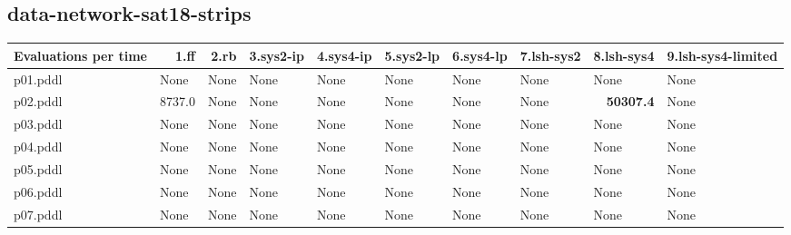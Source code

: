 \documentclass{article}
\begin{document}
\hypertarget{evaluations_per_time-data-network-sat18-strips}{}
\subsection*{data-network-sat18-strips}

\begin{tabular}{@{}lrrrrrrrrr@{}}
Evaluations per time & 1.ff & 2.rb & 3.sys2-ip & 4.sys4-ip & 5.sys2-lp & 6.sys4-lp & 7.lsh-sys2 & 8.lsh-sys4 & 9.lsh-sys4-limited \\
\midrule
p01.pddl & \multicolumn{1}{|l|}{None} & \multicolumn{1}{|l|}{None} & \multicolumn{1}{|l|}{None} & \multicolumn{1}{|l|}{None} & \multicolumn{1}{|l|}{None} & \multicolumn{1}{|l|}{None} & \multicolumn{1}{|l|}{None} & \multicolumn{1}{|l|}{None} & \multicolumn{1}{|l|}{None} \\
p02.pddl & 8737.0 & \multicolumn{1}{|l|}{None} & \multicolumn{1}{|l|}{None} & \multicolumn{1}{|l|}{None} & \multicolumn{1}{|l|}{None} & \multicolumn{1}{|l|}{None} & \multicolumn{1}{|l|}{None} & \textbf{50307.4} & \multicolumn{1}{|l|}{None} \\
p03.pddl & \multicolumn{1}{|l|}{None} & \multicolumn{1}{|l|}{None} & \multicolumn{1}{|l|}{None} & \multicolumn{1}{|l|}{None} & \multicolumn{1}{|l|}{None} & \multicolumn{1}{|l|}{None} & \multicolumn{1}{|l|}{None} & \multicolumn{1}{|l|}{None} & \multicolumn{1}{|l|}{None} \\
p04.pddl & \multicolumn{1}{|l|}{None} & \multicolumn{1}{|l|}{None} & \multicolumn{1}{|l|}{None} & \multicolumn{1}{|l|}{None} & \multicolumn{1}{|l|}{None} & \multicolumn{1}{|l|}{None} & \multicolumn{1}{|l|}{None} & \multicolumn{1}{|l|}{None} & \multicolumn{1}{|l|}{None} \\
p05.pddl & \multicolumn{1}{|l|}{None} & \multicolumn{1}{|l|}{None} & \multicolumn{1}{|l|}{None} & \multicolumn{1}{|l|}{None} & \multicolumn{1}{|l|}{None} & \multicolumn{1}{|l|}{None} & \multicolumn{1}{|l|}{None} & \multicolumn{1}{|l|}{None} & \multicolumn{1}{|l|}{None} \\
p06.pddl & \multicolumn{1}{|l|}{None} & \multicolumn{1}{|l|}{None} & \multicolumn{1}{|l|}{None} & \multicolumn{1}{|l|}{None} & \multicolumn{1}{|l|}{None} & \multicolumn{1}{|l|}{None} & \multicolumn{1}{|l|}{None} & \multicolumn{1}{|l|}{None} & \multicolumn{1}{|l|}{None} \\
p07.pddl & \multicolumn{1}{|l|}{None} & \multicolumn{1}{|l|}{None} & \multicolumn{1}{|l|}{None} & \multicolumn{1}{|l|}{None} & \multicolumn{1}{|l|}{None} & \multicolumn{1}{|l|}{None} & \multicolumn{1}{|l|}{None} & \multicolumn{1}{|l|}{None} & \multicolumn{1}{|l|}{None} \\

\end{tabular}
\end{document}
